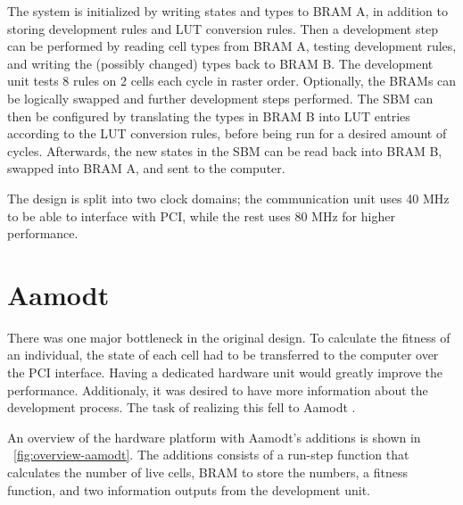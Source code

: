 The system is initialized by writing states and types to BRAM A, in addition to storing development rules and LUT conversion rules.
Then a development step can be performed by reading cell types from BRAM A\footnotemark, testing development rules, and writing the (possibly changed) types back to BRAM B.
The development unit tests 8 rules on 2 cells each cycle in raster order.
Optionally, the BRAMs can be logically swapped and further development steps performed.
The SBM can then be configured by translating the types in BRAM B into LUT entries according to the LUT conversion rules, before being run for a desired amount of cycles.
Afterwards, the new states in the SBM can be read back into BRAM B, swapped into BRAM A, and sent to the computer.

The design is split into two clock domains; the communication unit uses 40 MHz to be able to interface with PCI, while the rest uses 80 MHz for higher performance.


\section{Aamodt}

There was one major bottleneck in the original design.
To calculate the fitness of an individual, the state of each cell had to be transferred to the computer over the PCI interface.
Having a dedicated hardware unit would greatly improve the performance.
Additionaly, it was desired to have more information about the development process.
The task of realizing this fell to Aamodt \cite{aamodt2005sblock}.

An overview of the hardware platform with Aamodt's additions is shown in \figurename~\ref{fig:overview-aamodt}.
The additions consists of a run-step function that calculates the number of live cells, BRAM to store the numbers, a fitness function, and two information outputs from the development unit.

